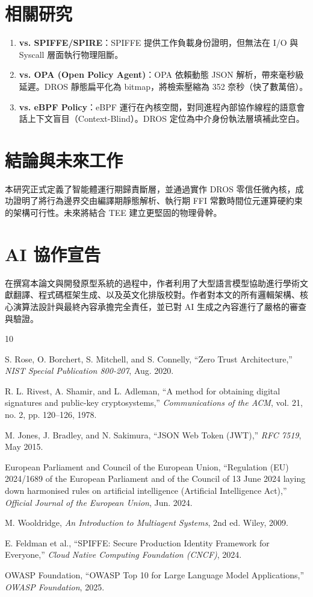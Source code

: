 \documentclass[UTF8]{ctexart}
\begin{document}
\section{相關研究}
\begin{enumerate}
\item \textbf{vs. SPIFFE/SPIRE}：SPIFFE 提供工作負載身份證明，但無法在 I/O 與 Syscall 層面執行物理阻斷。
\item \textbf{vs. OPA (Open Policy Agent)}：OPA 依賴動態 JSON 解析，帶來毫秒級延遲。DROS 靜態扁平化為 bitmap，將檢索壓縮為 352 奈秒（快了數萬倍）。
\item \textbf{vs. eBPF Policy}：eBPF 運行在內核空間，對同進程內部協作線程的語意會話上下文盲目（Context-Blind）。DROS 定位為中介身份執法層填補此空白。
\end{enumerate}

\section{結論與未來工作}
本研究正式定義了智能體運行期歸責斷層，並通過實作 DROS 零信任微內核，成功證明了將行為邊界交由編譯期靜態解析、執行期 FFI 常數時間位元運算硬約束的架構可行性。未來將結合 TEE 建立更堅固的物理骨幹。

\section*{AI 協作宣告}
在撰寫本論文與開發原型系統的過程中，作者利用了大型語言模型協助進行學術文獻翻譯、程式碼框架生成、以及英文化排版校對。作者對本文的所有邏輯架構、核心演算法設計與最終內容承擔完全責任，並已對 AI 生成之內容進行了嚴格的審查與驗證。

\begin{thebibliography}{10}

S. Rose, O. Borchert, S. Mitchell, and S. Connelly, ``Zero Trust Architecture,'' \emph{NIST Special Publication 800-207}, Aug. 2020.

R. L. Rivest, A. Shamir, and L. Adleman, ``A method for obtaining digital signatures and public-key cryptosystems,'' \emph{Communications of the ACM}, vol. 21, no. 2, pp. 120--126, 1978.

M. Jones, J. Bradley, and N. Sakimura, ``JSON Web Token (JWT),'' \emph{RFC 7519}, May 2015.

European Parliament and Council of the European Union, ``Regulation (EU) 2024/1689 of the European Parliament and of the Council of 13 June 2024 laying down harmonised rules on artificial intelligence (Artificial Intelligence Act),'' \emph{Official Journal of the European Union}, Jun. 2024.

M. Wooldridge, \emph{An Introduction to Multiagent Systems}, 2nd ed. Wiley, 2009.

E. Feldman et al., ``SPIFFE: Secure Production Identity Framework for Everyone,'' \emph{Cloud Native Computing Foundation (CNCF)}, 2024.

OWASP Foundation, ``OWASP Top 10 for Large Language Model Applications,'' \emph{OWASP Foundation}, 2025.

\end{thebibliography}
\end{document}
